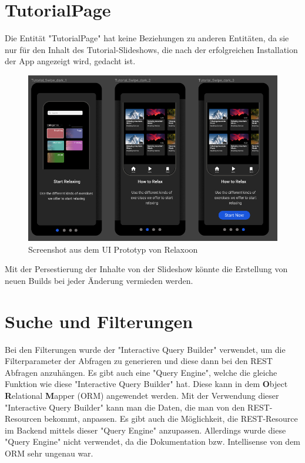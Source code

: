 \section{TutorialPage}
Die Entität "TutorialPage" hat keine Beziehungen zu anderen Entitäten, da sie nur für den Inhalt des Tutorial-Slideshows,
die nach der erfolgreichen Installation der App angezeigt wird, gedacht ist.

\begin{figure}[H]
    \centering
    \includegraphics[height=0.5\textwidth]{./pics/slideshow.png}
    \caption{Screenshot aus dem UI Prototyp von Relaxoon}
\end{figure}

Mit der Persestierung der Inhalte von der Slideshow könnte die Erstellung
von neuen Builds bei jeder Änderung vermieden werden.


\section{Suche und Filterungen}

Bei den Filterungen wurde der "Interactive Query Builder" verwendet,
um die Filterparameter der Abfragen zu generieren
und diese dann bei den REST Abfragen anzuhängen.
Es gibt auch eine "Query Engine", welche die gleiche Funktion wie diese
"Interactive Query Builder" hat.
Diese kann in dem \textbf{O}bject \textbf{R}elational \textbf{M}apper (ORM) angewendet werden.
Mit der Verwendung dieser "Interactive Query Builder" kann man die Daten,
die man von den REST-Resourcen bekommt, anpassen.
Es gibt auch die Möglichkeit, die REST-Resource im Backend mittels dieser
"Query Engine" anzupassen.
Allerdings wurde diese "Query Engine" nicht verwendet,
da die Dokumentation bzw. Intellisense von dem ORM sehr ungenau war.

